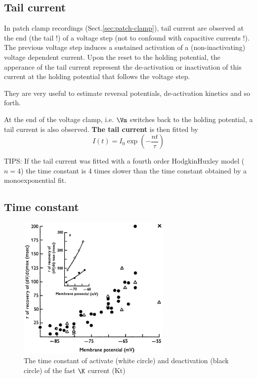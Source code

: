 \subsection{Tail current}
\label{sec:tail-current}

In patch clamp recordings (Sect.\ref{sec:patch-clamp}),
tail current are observed at the end (the tail !) of a voltage step (not to
confound with capacitive currents !). The previous voltage step induces
a sustained activation of a (non-inactivating) voltage dependent current. 
Upon the reset to the holding potential, the apperance of the tail current
represent the de-activation or inactivation of this current at the holding
potential that follows the voltage step.

They are very useful to estimate reversal potentials, de-activation kinetics and
so forth.

At the end of the voltage clamp, i.e. $\Vm$ switches back to the holding
potential, a tail current is also observed. {\bf The tail current} is then
fitted by
\begin{equation}
I(t) = I_0  \exp(-\frac{nt}{\tau})
\end{equation}

TIPS: If the tail current was fitted with a fourth order HodgkinHuxley model
($n=4$) the time constant is 4 times slower than the time constant obtained by a
monoexponential fit.

\subsection{Time constant}

\begin{figure}[hbt]
 \centerline{\includegraphics[height=7cm,
 angle=0]{./images/Na_tau_j_Gettes1974.eps}}
 \caption{The time constant of activate (white circle) and deactivation (black
 circle) of the fast $\K$ current (Kt) \citep{korngreen2000}}
\label{fig:time-constant-K-current}
\end{figure}

